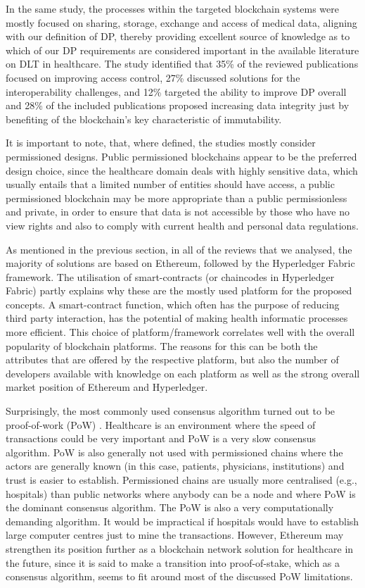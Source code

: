 In the same study, the processes within the targeted blockchain systems were mostly focused on sharing, storage, exchange and access of medical data, aligning with our definition of DP, thereby providing excellent source of knowledge as to which of our DP requirements are considered important in the available literature on DLT in healthcare. The study identified that 35\% of the reviewed publications focused on improving access control, 27\% discussed solutions for the interoperability challenges, and 12\% targeted the ability to improve DP overall and 28\% of the included publications proposed increasing data integrity just by benefiting of the blockchain's key characteristic of immutability.

It is important to note, that, where defined, the studies mostly consider permissioned designs. Public permissioned blockchains appear to be the preferred design choice, since the healthcare domain deals with highly sensitive data, which usually entails that a limited number of entities should have access, a public permissioned blockchain may be more appropriate than a public permissionless and private, in order to ensure that data is not accessible by those who have no view rights and also to comply with current health and personal data regulations.

As mentioned in the previous section, in all of the reviews that we analysed, the majority of solutions are based on Ethereum, followed by the Hyperledger Fabric framework. The utilisation of smart-contracts (or chaincodes in Hyperledger Fabric) partly explains why these are the mostly used platform for the proposed concepts. A smart-contract function, which often has the purpose of reducing third party interaction, has the potential of making health informatic processes more efficient. This choice of platform/framework correlates well with the overall popularity of blockchain platforms. The reasons for this can be both the attributes that are offered by the respective platform, but also the number of developers available with knowledge on each platform as well as the strong overall market position of Ethereum and Hyperledger. 

Surprisingly, the most commonly used consensus algorithm turned out to be proof-of-work (PoW) \cite{holbl2018systematic}. Healthcare is an environment where the speed of transactions could be very important and PoW is a very slow consensus algorithm. PoW is also generally not used with permissioned chains where the actors are generally known (in this case, patients, physicians, institutions) and trust is easier to establish. Permissioned chains are usually more centralised (e.g., hospitals) than public networks where anybody can be a node and where PoW is the dominant consensus algorithm. The PoW is also a very computationally demanding algorithm. It would be impractical if hospitals would have to establish large computer centres just to mine the transactions. However, Ethereum may strengthen its position further as a blockchain network solution for healthcare in the future, since it is said to make a transition into proof-of-stake, which as a consensus algorithm, seems to fit around most of the discussed PoW limitations.


